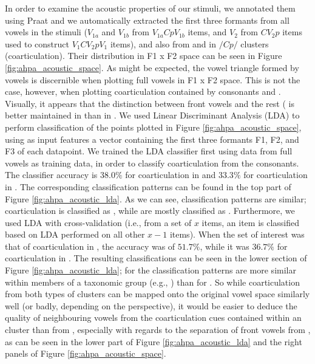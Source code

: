 {In order to examine the acoustic properties of our stimuli, we annotated them using Praat \cite{praat} and we automatically extracted the first three formants from all vowels in the stimuli ($V_{1a}$ and $V_{1b}$ from $V_{1a}CpV_{1b}$ items, and $V_{2}$ from $CV_{2}p$ items used to construct $V_{1}CV_{2}pV_{1}$ items), and also from  and  in $/Cp/$ clusters (coarticulation). Their distribution in F1 x F2 space can be seen in Figure \ref{fig:ahpa_acoustic_space}.
As might be expected, the vowel triangle formed by vowels  is discernible when plotting full vowels in F1 x F2 space. This is not the case, however, when plotting coarticulation contained by consonants  and . Visually, it appears that the distinction between front vowels  and the rest ( is better maintained in  than in .
We used Linear Discriminant Analysis (LDA) to perform classification of the points plotted in Figure \ref{fig:ahpa_acoustic_space}, using as input features a vector containing the first three formants F1, F2, and F3 of each datapoint. We trained the LDA classifier first using data from full vowels as training data, in order to classify coarticulation from the consonants. The classifier accuracy is $38.0\%$ for coarticulation in  and $33.3\%$ for coarticulation in . The corresponding classification patterns can be found in the top part of Figure \ref{fig:ahpa_acoustic_lda}. As we can see, classification patterns are similar;  coarticulation is classified as , while  are mostly classified as .
Furthermore, we used LDA with cross-validation (i.e., from a set of $x$ items, an item is classified based on LDA performed on all other $x-1$ items). When the set of interest was that of coarticulation in , the accuracy was of $51.7\%$, while it was $36.7\%$ for coarticulation in . The resulting classifications can be seen in the lower section of Figure \ref{fig:ahpa_acoustic_lda}; for  the classification patterns are more similar within members of a taxonomic group (e.g., ) than for . So while coarticulation from both types of clusters can be mapped onto the original vowel space similarly well (or badly, depending on the perspective), it would be easier to deduce the quality of neighbouring vowels from the coarticulation cues contained within an  cluster than from , especially with regards to the separation of front vowels  from , as can be seen in the lower part of Figure \ref{fig:ahpa_acoustic_lda} and the right panels of Figure \ref{fig:ahpa_acoustic_space}. 

}
